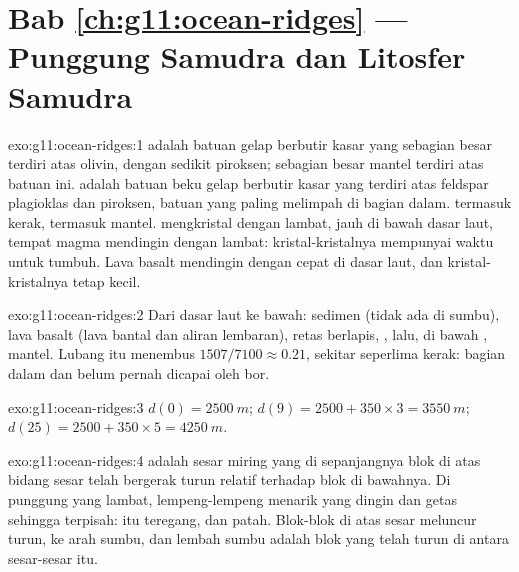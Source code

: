 \section*{Bab \ref{ch:g11:ocean-ridges} --- Punggung Samudra dan Litosfer Samudra}

\begin{solution}{exo:g11:ocean-ridges:1}
 adalah batuan gelap berbutir kasar yang sebagian besar terdiri atas
olivin, dengan sedikit piroksen; sebagian besar mantel terdiri atas batuan ini.
 adalah batuan beku gelap berbutir kasar yang terdiri atas feldspar
plagioklas dan piroksen, batuan yang paling melimpah di  bagian
dalam.  termasuk kerak,  termasuk mantel.  mengkristal dengan
lambat, jauh di bawah dasar laut, tempat magma mendingin dengan lambat:
kristal-kristalnya mempunyai waktu untuk tumbuh. Lava basalt mendingin dengan
cepat di dasar laut, dan kristal-kristalnya tetap kecil.
\end{solution}

\begin{solution}{exo:g11:ocean-ridges:2}
Dari dasar laut ke bawah: sedimen (tidak ada di sumbu), lava basalt (lava bantal
dan aliran lembaran), retas berlapis, , lalu, di bawah , 
mantel. Lubang itu menembus $1507/7100 \approx 0.21$, sekitar seperlima
kerak:  bagian dalam dan  belum pernah dicapai oleh bor.
\end{solution}

\begin{solution}{exo:g11:ocean-ridges:3}
$d(0) = \qty{2500}{m}$; $d(9) = 2500 + 350 \times 3 = \qty{3550}{m}$;
$d(25) = 2500 + 350 \times 5 = \qty{4250}{m}$.
\end{solution}

\begin{solution}{exo:g11:ocean-ridges:4}
 adalah sesar miring yang di sepanjangnya blok di atas bidang sesar
telah bergerak turun relatif terhadap blok di bawahnya. Di punggung yang lambat,
lempeng-lempeng menarik  yang dingin dan getas sehingga terpisah:
 itu teregang, dan patah. Blok-blok di atas sesar meluncur turun, ke arah
sumbu, dan lembah sumbu adalah blok yang telah turun di antara sesar-sesar itu.
\end{solution}

